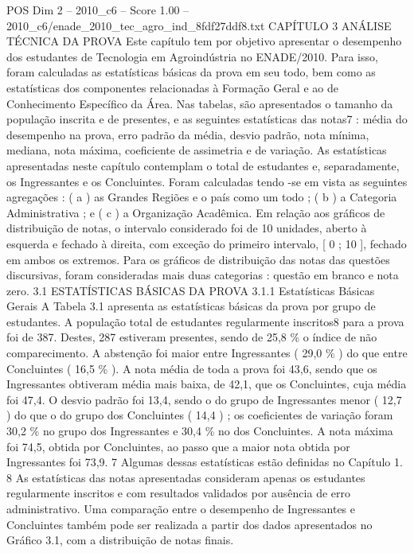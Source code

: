 \begin{textsample}{POS Dim 2 – 2010\_c6 – Score 1.00 – 2010\_c6/enade\_2010\_tec\_agro\_ind\_8fdf27ddf8.txt}  \label{ex:f2_pos_188}
CAPÍTULO 3 ANÁLISE TÉCNICA DA PROVA Este capítulo tem por objetivo apresentar o desempenho dos estudantes de Tecnologia em Agroindústria no ENADE/2010.
Para isso, foram calculadas as estatísticas básicas da prova em seu todo, bem como as estatísticas dos componentes relacionadas à Formação Geral e ao de Conhecimento Específico da Área.
Nas tabelas, são apresentados o tamanho da população inscrita e de presentes, e as seguintes estatísticas das notas7 : média do desempenho na prova, erro padrão da média, desvio padrão, nota mínima, mediana, nota máxima, coeficiente de assimetria e de variação.
As estatísticas apresentadas neste capítulo contemplam o total de estudantes e, separadamente, os Ingressantes e os Concluintes.
Foram calculadas tendo -se em vista as seguintes agregações : ( a ) as Grandes Regiões e o país como um todo ; ( b ) a Categoria Administrativa ; e ( c ) a Organização Acadêmica.
Em relação aos gráficos de distribuição de notas, o intervalo considerado foi de 10 unidades, aberto à esquerda e fechado à direita, com exceção do primeiro intervalo, [ 0 ; 10 ], fechado em ambos os extremos.
Para os gráficos de distribuição das notas das questões discursivas, foram consideradas mais duas categorias : questão em branco e nota zero. 3.1 ESTATÍSTICAS BÁSICAS DA PROVA 3.1.1 Estatísticas Básicas Gerais A Tabela 3.1 apresenta as estatísticas básicas da prova por grupo de estudantes.
A população total de estudantes regularmente inscritos8 para a prova foi de 387.
Destes, 287 estiveram presentes, sendo de 25,8 \% o índice de não comparecimento.
A abstenção foi maior entre Ingressantes ( 29,0 \% ) do que entre Concluintes ( 16,5 \% ).
A nota média de toda a prova foi 43,6, sendo que os Ingressantes obtiveram média mais baixa, de 42,1, que os Concluintes, cuja média foi 47,4.
O desvio padrão foi 13,4, sendo o do grupo de Ingressantes menor ( 12,7 ) do que o do grupo dos Concluintes ( 14,4 ) ; os coeficientes de variação foram 30,2 \% no grupo dos Ingressantes e 30,4 \% no dos Concluintes.
A nota máxima foi 74,5, obtida por Concluintes, ao passo que a maior nota obtida por Ingressantes foi 73,9. 7 Algumas dessas estatísticas estão definidas no Capítulo 1. 8 As estatísticas das notas apresentadas consideram apenas os estudantes regularmente inscritos e com resultados validados por ausência de erro administrativo.
Uma comparação entre o desempenho de Ingressantes e Concluintes também pode ser realizada a partir dos dados apresentados no Gráfico 3.1, com a distribuição de notas finais.

\end{textsample}
